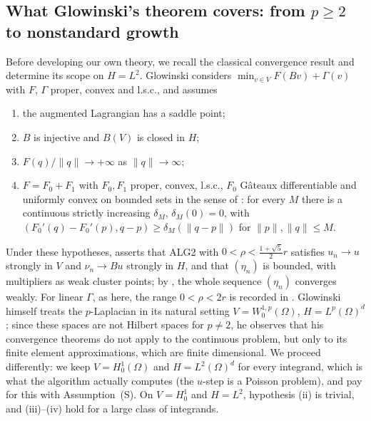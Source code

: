 \documentclass[11pt]{amsart}
\theoremstyle{definition}
\theoremstyle{remark}
\numberwithin{equation}{section}
\newcommand{\norm}[1]{\lVert #1\rVert}
\begin{document}
\subsection{What Glowinski's theorem covers: from \texorpdfstring{$p\ge2$}{p>=2} to nonstandard growth}\label{ssec:glowinski}
Before developing our own theory, we recall the classical convergence result and determine its scope on $H=L^2$. Glowinski \cite[Ch.~VI, \S\S4--5]{Glowinski1984ChVI} considers $\min_{v\in V}F(Bv)+\Gamma(v)$ with $F$, $\Gamma$ proper, convex and l.s.c., and assumes
\begin{enumerate}[label=(\roman*),leftmargin=2em]
\item the augmented Lagrangian has a saddle point;
\item $B$ is injective and $B(V)$ is closed in $H$;
\item $F(q)/\norm q\to+\infty$ as $\norm q\to\infty$;
\item $F=F_0+F_1$ with $F_0,F_1$ proper, convex, l.s.c., $F_0$ G\^ateaux differentiable and uniformly convex on bounded sets in the sense of \cite[(4.6)]{Glowinski1984ChVI}: for every $M$ there is a continuous strictly increasing $\delta_M$, $\delta_M(0)=0$, with $(F_0'(q)-F_0'(p),q-p)\ge\delta_M(\norm{q-p})$ for $\norm p,\norm q\le M$.
\end{enumerate}
Under these hypotheses, \cite[Thm.~5.1]{Glowinski1984ChVI} asserts that ALG2 with $0<\rho<\frac{1+\sqrt5}2r$ satisfies $u_n\to u$ strongly in $V$ and $\nu_n\to Bu$ strongly in $H$, and that $(\eta_n)$ is bounded, with multipliers as weak cluster points; by \cite[\S7]{Glowinski1984ChVI}, the whole sequence $(\eta_n)$ converges weakly. For linear $\Gamma$, as here, the range $0<\rho<2r$ is recorded in \cite[Rem.~5.1, \S6.3]{Glowinski1984ChVI}. Glowinski himself treats the $p$-Laplacian in its natural setting $V=W^{1,p}_0(\Omega)$, $H=L^p(\Omega)^d$ \cite[\S6.3]{Glowinski1984ChVI}; since these spaces are not Hilbert spaces for $p\ne2$, he observes that his convergence theorems do not apply to the continuous problem, but only to its finite element approximations, which are finite dimensional. We proceed differently: we keep $V=H^1_0(\Omega)$ and $H=L^2(\Omega)^d$ for every integrand, which is what the algorithm actually computes (the $u$-step is a Poisson problem), and pay for this with Assumption~(S). On $V=H^1_0$ and $H=L^2$, hypothesis (ii) is trivial, and (iii)--(iv) hold for a large class of integrands.
\end{document}
